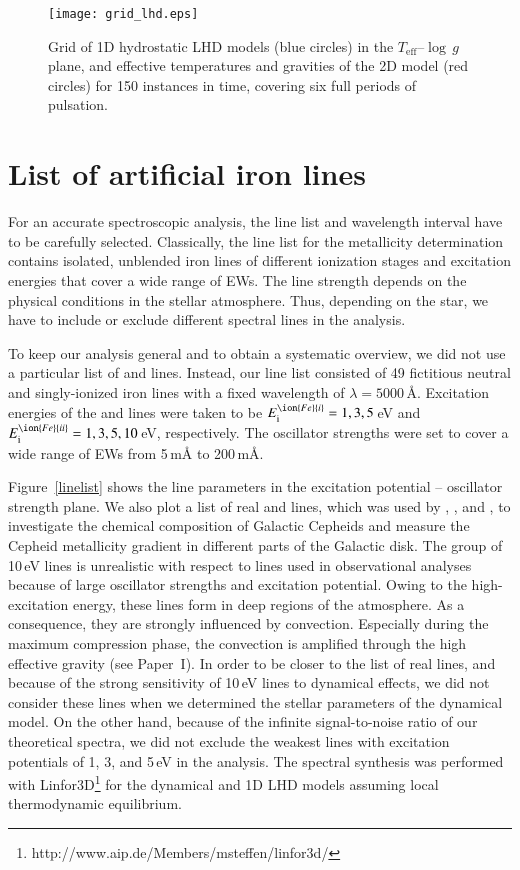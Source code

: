 \documentclass{aa}
\begin{document}
\begin{figure}
\texttt{[image: grid\_lhd.eps]}
\caption{Grid of 1D hydrostatic LHD models (blue circles) in the
  $T_\mathrm{eff}$--$\log\,g$ plane, and effective temperatures and
  gravities of the 2D model (red circles) for 150 instances in
  time, covering six full periods of pulsation.}
\label{grid}
\end{figure} 
   

\section{List of artificial iron lines}
For an accurate spectroscopic analysis, the line list and wavelength interval
have to be carefully selected.  Classically, the line list for the metallicity
determination contains isolated, unblended iron lines of different ionization
stages and excitation energies that cover a wide range of EWs.
The line strength depends on the physical conditions in the stellar
atmosphere. Thus, depending on the star, we have to include or exclude different
spectral lines in the analysis.

To keep our analysis general and to obtain a systematic overview, we did not
use a particular list of  and  lines. Instead, our line list
consisted of 49 fictitious neutral and singly-ionized iron lines with a fixed
wavelength of $\lambda=5000$\,\r{A}.  Excitation energies of the 
and  lines were taken to be $E_\mathrm{i}^{\ion{Fe}{i}}=1,3,5$\,eV
and $E_\mathrm{i}^{\ion{Fe}{ii}}=1,3,5,10$\,eV, respectively.  The oscillator
strengths were set to cover a wide range of EWs from 5\,m\r{A}
to 200\,m\r{A}.

Figure~\ref{linelist} shows the line parameters in the excitation 
potential -- oscillator strength plane.
We also plot a list of real
 and  lines, which was used by
\cite{2007A&A...467..283L, 2008A&A...490..613L}, \cite{ 2010A&A...518A..11P},
and \cite{2013A&A...554A.132G,2014A&A...566A..37G}, to investigate the chemical
composition of Galactic Cepheids and measure the Cepheid metallicity gradient
in different parts of the Galactic disk.  
The group of  10\,eV lines is unrealistic 
with respect to lines used in observational analyses because of 
large  oscillator strengths and excitation potential.
Owing to the high-excitation energy, these lines form in deep regions of 
the atmosphere. As a consequence, they are strongly influenced by convection.
Especially during the maximum
compression phase, the convection is
amplified through the
high effective gravity (see Paper~I).  In order to be closer to the list of
real lines, and because of the strong sensitivity of  10\,eV lines to
dynamical effects, we did not consider these lines when we determined
the stellar parameters of the dynamical model. On the other hand, because
of the
infinite signal-to-noise ratio of our theoretical spectra, we did not exclude
the weakest lines with excitation potentials of 1, 3, and 5\,eV in the analysis.
The spectral synthesis was performed with
Linfor3D\footnote{http://www.aip.de/Members/msteffen/linfor3d/}
\citep{2017MmSAI..88...82G}
for the dynamical and 1D LHD models assuming local
thermodynamic equilibrium.
\end{document}
